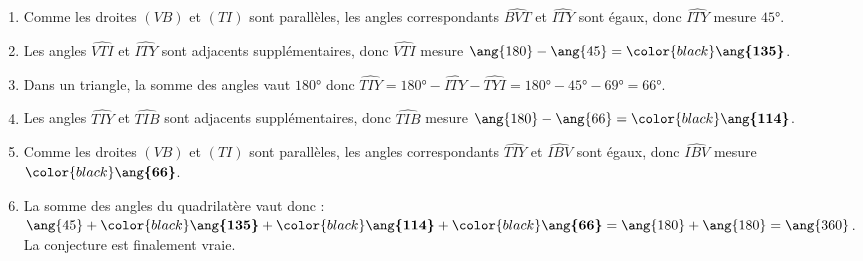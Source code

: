    \begin{enumerate}
      \item Comme les droites $(VB)$ et $(TI)$ sont parallèles, les angles correspondants $\widehat{BVT}$ et $\widehat{ITY}$ sont égaux, donc $\widehat{ITY}$ mesure $\ang{45}$.\\
      \item Les angles $\widehat{VTI}$ et $\widehat{ITY}$ sont adjacents supplémentaires, donc $\widehat{VTI}$ mesure $\ang{180}-\ang{45}={\color{black}\boldsymbol{\ang{135}}}$.\\
      \item Dans un triangle, la somme des angles vaut $\ang{180}$ donc $\widehat{TIY}=\ang{180}-\widehat{ITY}-\widehat{TYI}=\ang{180}-\ang{45}-\ang{69}=\ang{66}$.\\
      \item Les angles $\widehat{TIY}$ et $\widehat{TIB}$ sont adjacents supplémentaires, donc $\widehat{TIB}$ mesure $\ang{180}-\ang{66}={\color{black}\boldsymbol{\ang{114}}}$.\\
      \item Comme les droites $(VB)$ et $(TI)$ sont parallèles, les angles correspondants $\widehat{TIY}$ et $\widehat{IBV}$ sont égaux, donc $\widehat{IBV}$ mesure ${\color{black}\boldsymbol{\ang{66}}}$.\\
      \item La somme des angles du quadrilatère vaut donc : $\ang{45}+{\color{black}\boldsymbol{\ang{135}}}+{\color{black}\boldsymbol{\ang{114}}}+{\color{black}\boldsymbol{\ang{66}}}=\ang{180}+\ang{180}=\ang{360}$.\\
      La conjecture est finalement vraie.
   \end{enumerate}
